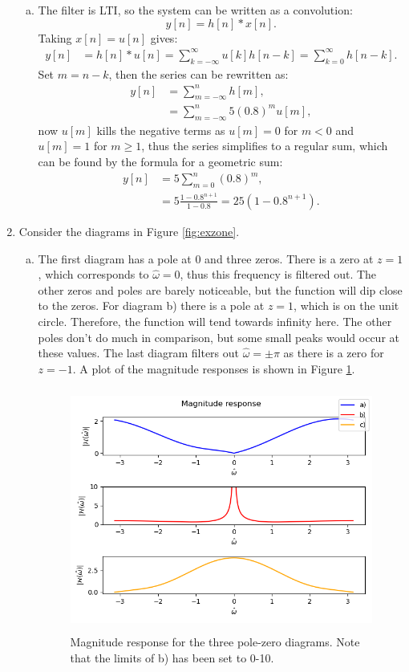 \begin{enumerate}
\begin{enumerate}[a)]
\item The filter is LTI, so the system can be written as a convolution:
$$y[n]=h[n]*x[n].$$
Taking $x[n]=u[n]$ gives:
\begin{align*}
    y[n] &= h[n]*u[n] = \sum_{k=-\infty}^{\infty}u[k]h[n-k] = \sum_{k=0}^{\infty}h[n-k]. 
\end{align*}
Set $m=n-k$, then the series can be rewritten as:
\begin{align*}
    y[n] &= \sum_{m=-\infty}^{n}h[m], \\
         &= \sum_{m=-\infty}^{n}5(0.8)^{m}u[m],
\end{align*}
now $u[m]$ kills the negative terms as $u[m]=0$ for $m<0$ and $u[m]=1$ for $m\ge 1$, thus the series simplifies to a regular sum, which can be found by the formula for a geometric sum:
\begin{align*}
    y[n] &= 5\sum_{m=0}^{n}(0.8)^{m}, \\
    &= 5\frac{1-0.8^{n+1}}{1-0.8} = 25(1-0.8^{n+1}).
\end{align*}
\end{enumerate}

\item Consider the diagrams in Figure \ref{fig:exzone}.
\begin{enumerate}[a)]
\item The first diagram has a pole at $0$ and three zeros. There is a zero at $z=1$, which corresponds to $\hat{\omega}=0$, thus this frequency is filtered out. The other zeros and poles are barely noticeable, but the function will dip close to the zeros. For diagram b) there is a pole at $z=1$, which is on the unit circle. Therefore, the function will tend towards infinity here. The other poles don't do much in comparison, but some small peaks would occur at these values. The last diagram filters out $\hat{\omega}=\pm\pi$ as there is a zero for $z=-1$. A plot of the magnitude responses is shown in Figure \ref{fig:mag_res_diag}.

\begin{figure}
    \centering
    \includegraphics[width=10.5cm,height=8.0cm]{ch19/figures/magn_resp_diag.png}
    \caption{Magnitude response for the three pole-zero diagrams. Note that the limits of b) has been set to 0-10.}
    \label{fig:mag_res_diag}
\end{figure}


\end{enumerate}
\end{enumerate}
